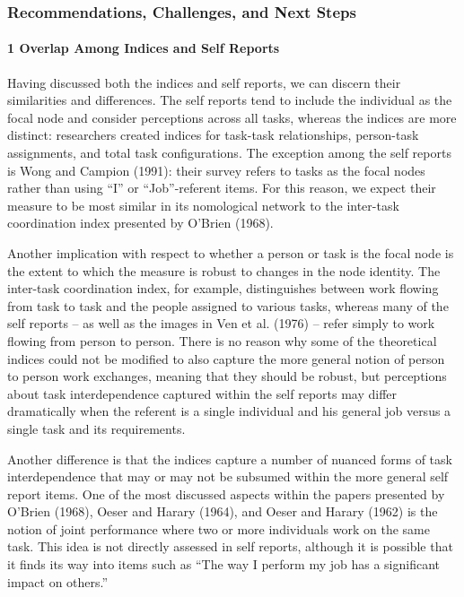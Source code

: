\documentclass[english,,man]{apa6}
\let\oldparagraph\paragraph
\renewcommand{\paragraph}[1]{\oldparagraph{#1}\mbox{}}
\theoremstyle{definition}
\theoremstyle{definition}
\theoremstyle{definition}
\theoremstyle{remark}
\begin{document}
\hypertarget{recommendations-challenges-and-next-steps}{%
\subsubsection{Recommendations, Challenges, and Next
Steps}\label{recommendations-challenges-and-next-steps}}

\hypertarget{overlap-among-indices-and-self-reports}{%
\paragraph{1 Overlap Among Indices and Self
Reports}\label{overlap-among-indices-and-self-reports}}

Having discussed both the indices and self reports, we can discern their
similarities and differences. The self reports tend to include the
individual as the focal node and consider perceptions across all tasks,
whereas the indices are more distinct: researchers created indices for
task-task relationships, person-task assignments, and total task
configurations. The exception among the self reports is Wong and Campion
(1991): their survey refers to tasks as the focal nodes rather than
using \enquote{I} or \enquote{Job}-referent items. For this reason, we
expect their measure to be most similar in its nomological network to
the inter-task coordination index presented by O'Brien (1968).

Another implication with respect to whether a person or task is the
focal node is the extent to which the measure is robust to changes in
the node identity. The inter-task coordination index, for example,
distinguishes between work flowing from task to task and the people
assigned to various tasks, whereas many of the self reports -- as well
as the images in Ven et al. (1976) -- refer simply to work flowing from
person to person. There is no reason why some of the theoretical indices
could not be modified to also capture the more general notion of person
to person work exchanges, meaning that they should be robust, but
perceptions about task interdependence captured within the self reports
may differ dramatically when the referent is a single individual and his
general job versus a single task and its requirements.

Another difference is that the indices capture a number of nuanced forms
of task interdependence that may or may not be subsumed within the more
general self report items. One of the most discussed aspects within the
papers presented by O'Brien (1968), Oeser and Harary (1964), and Oeser
and Harary (1962) is the notion of joint performance where two or more
individuals work on the same task. This idea is not directly assessed in
self reports, although it is possible that it finds its way into items
such as \enquote{The way I perform my job has a significant impact on
others.}
\end{document}
